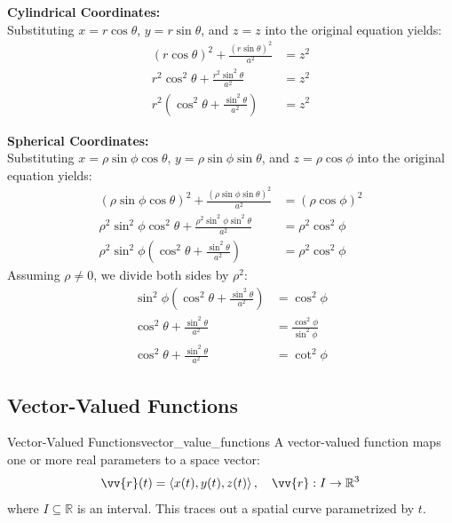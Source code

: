 \begin{sol}
\textbf{Cylindrical Coordinates:} \\
Substituting $x = r\cos\theta$, $y = r\sin\theta$, and $z = z$ into the original equation yields:
\begin{align*}
(r\cos\theta)^2 + \frac{(r\sin\theta)^2}{a^2} &= z^2 \\
r^2\cos^2\theta + \frac{r^2\sin^2\theta}{a^2} &= z^2 \\
r^2\left(\cos^2\theta + \frac{\sin^2\theta}{a^2}\right) &= z^2
\end{align*}

\textbf{Spherical Coordinates:} \\
Substituting $x = \rho\sin\phi\cos\theta$, $y = \rho\sin\phi\sin\theta$, and $z = \rho\cos\phi$ into the original equation yields:
\begin{align*}
(\rho\sin\phi\cos\theta)^2 + \frac{(\rho\sin\phi\sin\theta)^2}{a^2} &= (\rho\cos\phi)^2 \\
\rho^2\sin^2\phi\cos^2\theta + \frac{\rho^2\sin^2\phi\sin^2\theta}{a^2} &= \rho^2\cos^2\phi \\
\rho^2\sin^2\phi\left(\cos^2\theta + \frac{\sin^2\theta}{a^2}\right) &= \rho^2\cos^2\phi
\end{align*}
Assuming $\rho \neq 0$, we divide both sides by $\rho^2$:
\begin{align*}
\sin^2\phi\left(\cos^2\theta + \frac{\sin^2\theta}{a^2}\right) &= \cos^2\phi \\
\cos^2\theta + \frac{\sin^2\theta}{a^2} &= \frac{\cos^2\phi}{\sin^2\phi} \\
\cos^2\theta + \frac{\sin^2\theta}{a^2} &= \cot^2\phi
\end{align*}
\end{sol}

\subsection{Vector-Valued Functions}

\begin{definition}{Vector-Valued Functions}{vector_value_functions}
A vector-valued function maps one or more real parameters to a space vector:
\[
\vv{r}(t) = \ang{x(t), y(t), z(t)}, \quad \vv{r}: I \rightarrow \mathbb{R}^3
\]
where $I \subseteq \mathbb{R}$ is an interval. This traces out a spatial curve parametrized by $t$.
\end{definition}

